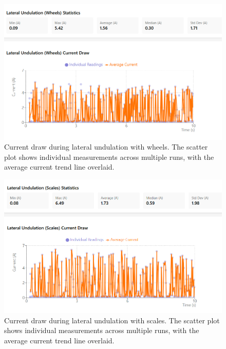 \documentclass[12pt,a4paper]{report}
\begin{document}
\begin{figure}[H]
    \centering
    \includegraphics[width=12cm]{media/lateral_wheels_current.png}
    \caption{Current draw during lateral undulation with wheels. The scatter plot shows individual measurements across multiple runs, with the average current trend line overlaid.}
    \label{fig:lateral_wheels_current}
\end{figure}

\begin{figure}[H]
    \centering
    \includegraphics[width=12cm]{media/lateral_scales_current.png}
    \caption{Current draw during lateral undulation with scales. The scatter plot shows individual measurements across multiple runs, with the average current trend line overlaid.}
    \label{fig:lateral_scales_current}
\end{figure}
\end{document}
